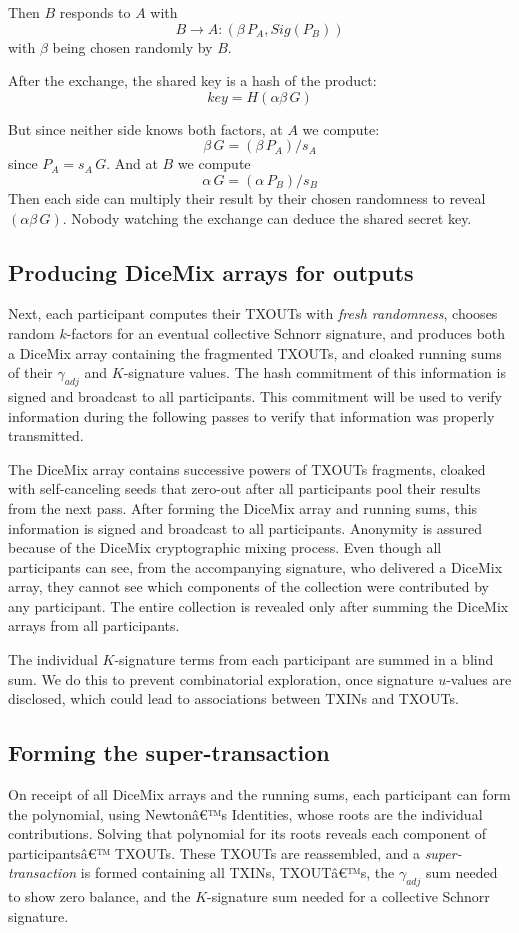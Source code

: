 \documentclass[8pt,fleqn,openany]{book}
\begin{document}
{		Then $B$ responds to $A$ with
		$$B \rightarrow A: (\beta \, P_A, Sig(P_B))$$
		with $\beta$ being chosen randomly by $B$. 
		
		After the exchange, the shared key is a hash of the product:
		$$key = H(\alpha \beta \, G)$$ 
		
		But since neither side knows both factors, at $A$ we compute:
		$$\beta \, G = (\beta \, P_A) / s_A$$
		since $P_A = s_A \, G$. And at $B$ we compute
		$$\alpha \, G = (\alpha \, P_B) / s_B$$
		Then each side can multiply their result by their chosen randomness to reveal $(\alpha \beta \, G)$. Nobody watching the exchange can deduce the shared secret key.
		
		\subsection{Producing DiceMix arrays for outputs} 
		Next, each participant computes their TXOUTs with \textit{fresh randomness}, chooses random $k$-factors for an eventual collective Schnorr signature, and produces both a DiceMix array containing the fragmented TXOUTs, and cloaked running sums of their $\gamma_{adj}$ and $K$-signature values. The hash commitment of this information is signed and broadcast to all participants. This commitment will be used to verify information during the following passes to verify that information was properly transmitted.
		
		The DiceMix array contains successive powers of TXOUTs fragments, cloaked with self-canceling seeds that zero-out after all participants pool their results from the next pass. After forming the DiceMix array and running sums, this information is signed and broadcast to all participants. Anonymity is assured because of the DiceMix cryptographic mixing process. Even though all participants can see, from the accompanying signature, who delivered a DiceMix array, they cannot see which components of the collection were contributed by any participant. The entire collection is revealed only after summing the DiceMix arrays from all participants.
		
		The individual $K$-signature terms from each participant are summed in a blind sum. We do this to prevent combinatorial exploration, once signature $u$-values are disclosed, which could lead to associations between TXINs and TXOUTs.
		
		\subsection{Forming the super-transaction} 
		On receipt of all DiceMix arrays and the running sums, each participant can form the polynomial, using Newtonâ€™s Identities, whose roots are the individual contributions. Solving that polynomial for its roots reveals each component of participantsâ€™ TXOUTs. These TXOUTs are reassembled, and a \textit{super-transaction} is formed containing all TXINs, TXOUTâ€™s, the $\gamma_{adj}$ sum needed to show zero balance, and the $K$-signature sum needed for a collective Schnorr signature.
		
}
\end{document}
